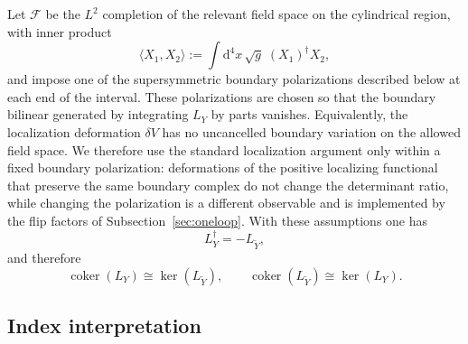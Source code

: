 \documentclass[11pt,a4paper]{article}
\numberwithin{equation}{section}
\theoremstyle{plain}
\theoremstyle{definition}
\theoremstyle{remark}
\newcommand{\dd}{\mathrm{d}}
\begin{document}
Let $\mathscr F$ be the $L^2$ completion of the relevant field space on the cylindrical region, with inner product
\begin{equation}
\langle X_1, X_2\rangle := \int \dd^4x\,\sqrt{g}\; (X_1)^\dagger X_2,
\label{eq:innerprod}
\end{equation}
and impose one of the supersymmetric boundary polarizations described below at each end of the interval.  These polarizations are chosen so that the boundary bilinear generated by integrating $L_Y$ by parts vanishes.  Equivalently, the localization deformation $\delta V$ has no uncancelled boundary variation on the allowed field space.  We therefore use the standard localization argument only within a fixed boundary polarization: deformations of the positive localizing functional that preserve the same boundary complex do not change the determinant ratio, while changing the polarization is a different observable and is implemented by the flip factors of Subsection~\ref{sec:oneloop}.  With these assumptions one has
\begin{equation}
L_Y^\dagger=-L_{\widetilde Y},
\label{eq:adjoint}
\end{equation}
and therefore
\begin{equation}
\operatorname{coker}(L_Y)\cong\ker(L_{\widetilde Y}),
\qquad
\operatorname{coker}(L_{\widetilde Y})\cong\ker(L_Y).
\label{eq:cokerker}
\end{equation}

\subsection{Index interpretation}\label{sec:index-interpretation}
\end{document}
